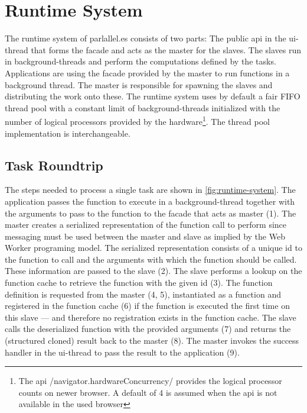 \section{Runtime System}\label{sec:runtime-system}
The runtime system of parlallel.es consists of two parts: The public api in the ui-thread that forms the facade and acts as the master for the slaves. The slaves run in background-threads and perform the computations defined by the tasks. Applications are using the facade provided by the master to run functions in a background thread. The master is responsible for spawning the slaves and distributing the work onto these. The runtime system uses by default a fair FIFO thread pool with a constant limit of background-threads initialized with the number of logical processors provided by the hardware\footnote{The api \javascriptinline/navigator.hardwareConcurrency/ provides the logical processor counts on newer browser. A default of 4 is assumed when the api is not available in the used browser}. The thread pool implementation is interchangeable. 

\subsection{Task Roundtrip}
The steps needed to process a single task are shown in \cref{fig:runtime-system}. The application passes the function to execute in a background-thread together with the arguments to pass to the function to the facade that acts as master (1). The master creates a serialized representation of the function call to perform since messaging must be used between the master and slave as implied by the Web Worker programing model. The serialized representation consists of a unique id to the function to call and the arguments with which the function should be called. These information are passed to the slave (2). The slave performs a lookup on the function cache to retrieve the function with the given id (3). The function definition is requested from the master (4, 5), instantiated as a function and registered in the function cache (6) if the function is executed the first time on this slave --- and therefore no registration exists in the function cache. The slave calls the deserialized function with the provided arguments (7) and returns the (structured cloned) result back to the master (8). The master invokes the success handler in the ui-thread to pass the result to the application (9). 

